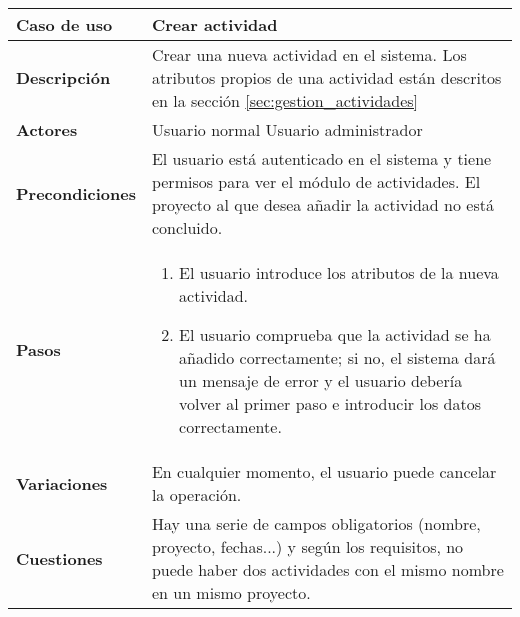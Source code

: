 \begin{tabular}{|p{1.25in}|p{3.65in}|}\hline
\textbf{Caso de uso} & \textbf{Crear actividad}\\\hline\hline
\textbf{Descripción} & Crear una nueva actividad en el sistema. Los
atributos propios de una actividad están descritos en la sección
\ref{sec:gestion_actividades}\\\hline
\textbf{Actores} & Usuario normal \newline Usuario administrador\\\hline
\textbf{Precondiciones} & El usuario está autenticado en el sistema y
tiene permisos para ver el módulo de actividades. El proyecto al que desea
añadir la actividad no está concluido. \\\hline
\textbf{Pasos} & 
  \begin{enumerate}
   \item El usuario introduce los atributos de la nueva actividad.
   \item El usuario comprueba que la actividad se ha añadido correctamente; si
no, el sistema dará un mensaje de error y el usuario debería volver al primer
paso e introducir los datos correctamente.
  \end{enumerate}
\\\hline
\textbf{Variaciones} & En cualquier momento, el usuario puede cancelar
la operación.\\\hline
\textbf{Cuestiones} & Hay una serie de campos obligatorios (nombre,
proyecto, fechas...) y según los requisitos, no puede haber dos actividades
con el mismo nombre en un mismo proyecto.\\\hline
\end{tabular}

